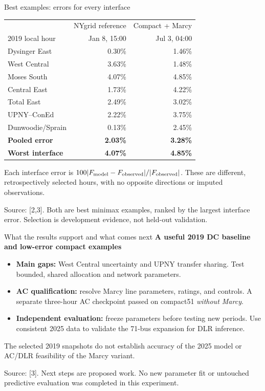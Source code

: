 \documentclass[aspectratio=169,10pt]{beamer}
\renewcommand{\source}[1]{\par\vfill{\color{muted}\fontsize{6.5}{7.5}\selectfont Source: #1\par}}
\newcommand{\lead}[1]{{\large\color{navy}\bfseries #1}\par\medskip}
\newcommand{\minor}[1]{{\small\color{muted}#1}\par}
\newcommand{\tightitems}{\setlength{\itemsep}{1em}}
\begin{document}
\begin{frame}{Best examples: errors for every interface}
\begin{center}
\small
\begin{tabular}{lrr}
\toprule
 & NYgrid reference & Compact + Marcy \\
2019 local hour & Jan 8, 15:00 & Jul 3, 04:00 \\
\midrule
Dysinger East & 0.30\% & 1.46\% \\
West Central & 3.63\% & 1.48\% \\
Moses South & 4.07\% & 4.85\% \\
Central East & 1.73\% & 4.22\% \\
Total East & 2.49\% & 3.02\% \\
UPNY--ConEd & 2.22\% & 3.75\% \\
Dunwoodie/Sprain & 0.13\% & 2.45\% \\
\midrule
\textbf{Pooled error} & \textbf{2.03\%} & \textbf{3.28\%} \\
\textbf{Worst interface} & \textbf{4.07\%} & \textbf{4.85\%} \\
\bottomrule
\end{tabular}
\end{center}
\minor{Each interface error is $100|F_{\rm model}-F_{\rm observed}|/|F_{\rm observed}|$. These are different, retrospectively selected hours, with no opposite directions or imputed observations.}
\source{[2,3]. Both are best minimax examples, ranked by the largest interface error. Selection is development evidence, not held-out validation.}
\end{frame}

\begin{frame}{What the results support and what comes next}
\lead{A useful 2019 DC baseline and low-error compact examples}
\begin{itemize}\tightitems
\item \textbf{Main gaps:} West Central uncertainty and UPNY transfer sharing. Test bounded, shared allocation and network parameters.
\item \textbf{AC qualification:} resolve Marcy line parameters, ratings, and controls. A separate three-hour AC checkpoint passed on compact51 \emph{without Marcy}.
\item \textbf{Independent evaluation:} freeze parameters before testing new periods. Use consistent 2025 data to validate the 71-bus expansion for DLR inference.
\end{itemize}
\par\bigskip
\minor{The selected 2019 snapshots do not establish accuracy of the 2025 model or AC/DLR feasibility of the Marcy variant.}
\source{[3]. Next steps are proposed work. No new parameter fit or untouched predictive evaluation was completed in this experiment.}
\end{frame}
\end{document}
